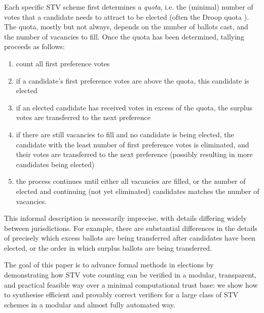 \documentclass[10pt,conference]{IEEEtran}
\begin{document}

Each specific STV scheme first determines a \emph{quota}, i.e. the (minimal) number of votes that a candidate needs to attract to be elected (often the Droop quota \cite{Droop:1881:MER}). The quota, mostly but not always, depends on the number of ballots cast, and the number of vacancies to fill. Once the quota has been determined, tallying proceeds as follows:
\begin{enumerate}
  \item count all first preference votes
  \item if a candidate's first preference votes are above the quota, this candidate is elected
  \item if an elected candidate has received votes in excess of the quota, the surplus votes are transferred to the next preference 
  \item if there are still vacancies to fill and no candidate is  being elected, the candidate with the least number of first preference votes is eliminated, and their votes are transferred to the next preference (possibly resulting in more candidates being elected)
  \item the process continues until either all vacancies are filled, or the number of elected and continuing (not yet eliminated) candidates matches the number of vacancies.
\end{enumerate}

This informal description is necessarily imprecise, with details
differing widely between jurisdictions. For example, there are
substantial differences in the details of
precisely which excess ballots are being transferred after
candidates have been elected, or  the order in which surplus ballots are
being transferred.

The goal of this paper is to advance formal methods in elections by
demonstrating how STV vote counting can be verified in a modular,
transparent, and practical feasible way over a minimal computational
trust base:  we show how to synthesise efficient and provably
correct verifiers for a large class of STV schemes in a modular and
almost fully automated way.
\end{document}
